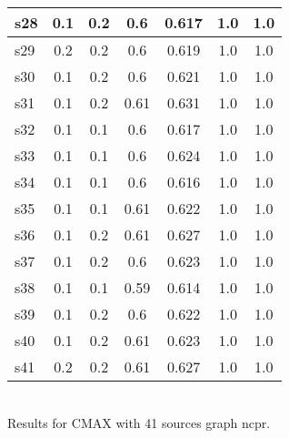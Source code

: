 \documentclass{article}
\begin{document}
\begin{tabular}{|l|c|c|c|c|c|c|}
\hline
s28 &0.1 & 0.2 & 0.6 & 0.617 & 1.0 & 1.0\\
\hline
s29 &0.2 & 0.2 & 0.6 & 0.619 & 1.0 & 1.0\\
\hline
s30 &0.1 & 0.2 & 0.6 & 0.621 & 1.0 & 1.0\\
\hline
s31 &0.1 & 0.2 & 0.61 & 0.631 & 1.0 & 1.0\\
\hline
s32 &0.1 & 0.1 & 0.6 & 0.617 & 1.0 & 1.0\\
\hline
s33 &0.1 & 0.1 & 0.6 & 0.624 & 1.0 & 1.0\\
\hline
s34 &0.1 & 0.1 & 0.6 & 0.616 & 1.0 & 1.0\\
\hline
s35 &0.1 & 0.1 & 0.61 & 0.622 & 1.0 & 1.0\\
\hline
s36 &0.1 & 0.2 & 0.61 & 0.627 & 1.0 & 1.0\\
\hline
s37 &0.1 & 0.2 & 0.6 & 0.623 & 1.0 & 1.0\\
\hline
s38 &0.1 & 0.1 & 0.59 & 0.614 & 1.0 & 1.0\\
\hline
s39 &0.1 & 0.2 & 0.6 & 0.622 & 1.0 & 1.0\\
\hline
s40 &0.1 & 0.2 & 0.61 & 0.623 & 1.0 & 1.0\\
\hline
s41 &0.2 & 0.2 & 0.61 & 0.627 & 1.0 & 1.0\\
\hline
\end{tabular}\\

\noindent Results for CMAX with 41 sources graph ncpr.
\end{document}
